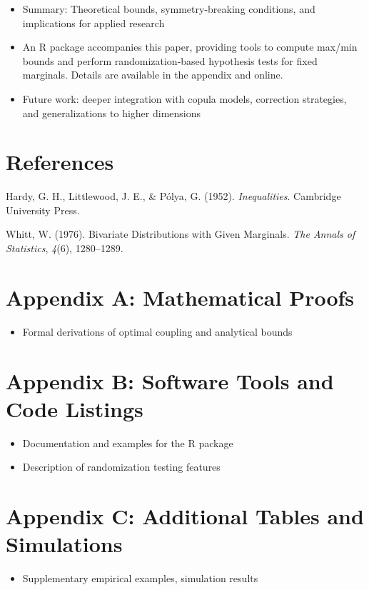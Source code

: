 \documentclass[
  12pt,
]{article}
\providecommand{\tightlist}{%
  \setlength{\itemsep}{0pt}\setlength{\parskip}{0pt}}\usepackage{longtable,booktabs,array}
\newlength{\cslhangindent}
\newenvironment{CSLReferences}[2] %
 {\begin{list}{}{%
  \setlength{\itemindent}{0pt}
  \setlength{\leftmargin}{0pt}
  \setlength{\parsep}{0pt}
  \ifodd #1
   \setlength{\leftmargin}{\cslhangindent}
   \setlength{\itemindent}{-1\cslhangindent}
  \fi
  \setlength{\itemsep}{#2\baselineskip}}}
 {\end{list}}
\theoremstyle{plain}
\theoremstyle{definition}
\theoremstyle{remark}
\begin{document}
\begin{itemize}
\tightlist
\item
  Summary: Theoretical bounds, symmetry-breaking conditions, and
  implications for applied research
\item
  An R package accompanies this paper, providing tools to compute
  max/min bounds and perform randomization-based hypothesis tests for
  fixed marginals. Details are available in the appendix and online.
\item
  Future work: deeper integration with copula models, correction
  strategies, and generalizations to higher dimensions
\end{itemize}

\newpage

\section{References}\label{references}

\label{refs}
\begin{CSLReferences}{1}{0}
Hardy, G. H., Littlewood, J. E., \& Pólya, G. (1952).
\emph{Inequalities}. Cambridge University Press.

Whitt, W. (1976). Bivariate {Distributions} with {Given Marginals}.
\emph{The Annals of Statistics}, \emph{4}(6), 1280--1289.

\end{CSLReferences}

\newpage

\appendix

\section{Appendix A: Mathematical
Proofs}\label{appendix-a-mathematical-proofs}

\begin{itemize}
\tightlist
\item
  Formal derivations of optimal coupling and analytical bounds
\end{itemize}

\section{Appendix B: Software Tools and Code
Listings}\label{appendix-b-software-tools-and-code-listings}

\begin{itemize}
\tightlist
\item
  Documentation and examples for the R package\\
\item
  Description of randomization testing features
\end{itemize}

\section{Appendix C: Additional Tables and
Simulations}\label{appendix-c-additional-tables-and-simulations}

\begin{itemize}
\tightlist
\item
  Supplementary empirical examples, simulation results
\end{itemize}
\end{document}

